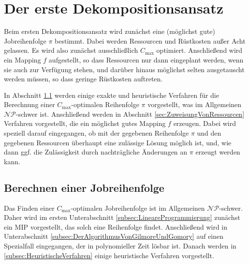 \documentclass{scrreprt}
\begin{document}
\chapter{Der erste Dekompositionsansatz}
Beim ersten Dekompositionsansatz wird zunächst eine (möglichst gute) Jobreihenfolge $\pi$ bestimmt.
Dabei werden Ressourcen und Rüstkosten außer Acht gelassen. 
Es wird also zunächst ausschließlich $C_{\max}$ optimiert. Anschließend wird ein Mapping $f$ aufgestellt,
so dass Ressourcen nur dann eingeplant werden, wenn sie auch zur Verfügung stehen, und darüber hinaus
möglichst selten ausgetauscht werden müssen, so dass geringe Rüstkosten auftreten.

In Abschnitt \ref{sec:BerechnenEinerJobreihenfolge} werden einige exakte und heuristische Verfahren für die
Berechnung einer $C_{\max}$-optimalen Reihenfolge $\pi$ vorgestellt, was im Allgemeinen $\mathcal{NP}$-schwer ist.
Anschließend werden in Abschnitt \ref{sec:ZuweisungVonRessourcen} Verfahren vorgestellt, die ein möglichst gutes Mapping $f$ erzeugen.
Dabei wird speziell darauf eingegangen, ob mit der gegebenen Reihenfolge $\pi$ und den gegebenen Ressourcen
überhaupt eine zulässige Lösung möglich ist, und, wie dann ggf. die Zulässigkeit durch nachträgliche Änderungen an $\pi$
erzeugt werden kann.

\section{Berechnen einer Jobreihenfolge}
\label{sec:BerechnenEinerJobreihenfolge}
Das Finden einer $C_{\max}$-optimalen Jobreihenfolge ist im Allgemeinen $\mathcal{NP}$-schwer.
Daher wird im ersten Unterabschnitt \ref{subsec:LineareProgrammierung} zunächst ein MIP vorgestellt,
das solch eine Reihenfolge findet.
Anschließend wird in Unterabschnitt \ref{subsec:DerAlgorithmusVonGilmoreUndGomory} auf einen Spezialfall eingegangen, der in polynomieller Zeit lösbar ist.
Danach werden in \ref{subsec:HeuristischeVerfahren} einige heuristische Verfahren vorgestellt.
\end{document}

